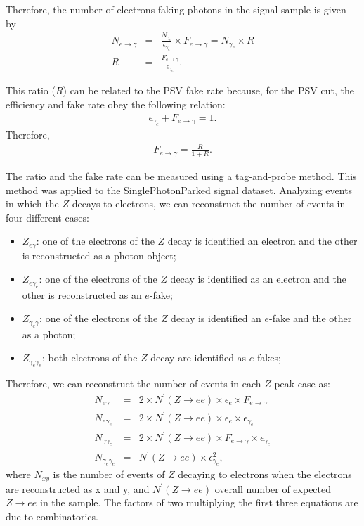 Therefore, the number of electrons-faking-photons in the signal sample is given by
\begin{eqnarray}
N_{e \rightarrow \gamma} &=& \frac{N_{\gamma_e}}{\epsilon_{\gamma_e}} \times  F_{e\rightarrow \gamma} = N_{\gamma_e} \times R\\
R  &=& \frac{F_{e\rightarrow \gamma}}{\epsilon_{\gamma_e}}.
\end{eqnarray}

This ratio ($R$) can be related to the PSV fake rate because, for the PSV cut, the efficiency and fake rate obey the following relation:
\begin{eqnarray}
\epsilon_{\gamma_e} + F_{e\rightarrow \gamma} = 1.
\end{eqnarray}
Therefore,
\begin{eqnarray}
F_{e \rightarrow \gamma} = \frac{R}{1+R}.
\end{eqnarray}

The ratio and the fake rate can be measured using a tag-and-probe method. This method was applied to the SinglePhotonParked signal dataset. Analyzing events in which the $Z$ decays to electrons, we can reconstruct the number of events in four different cases:

\begin{itemize}
\item $Z_{e\gamma}$: one of the electrons of the $Z$ decay is identified an electron and the other is reconstructed as a photon object;
\item $Z_{e\gamma_e}$: one of the electrons of the $Z$ decay is identified as an electron and the other is reconstructed as an $e$-fake;
\item $Z_{\gamma_e\gamma}$: one of the electrons of the $Z$ decay is identified an $e$-fake and the other as a photon;
\item $Z_{\gamma_e \gamma_e}$:  both electrons of the $Z$ decay are identified as $e$-fakes;
\end{itemize} 

Therefore, we can reconstruct the number of events in each $Z$ peak case as:
\begin{eqnarray}
N_{e\gamma} &=& 2\times N^\prime\left( Z\rightarrow ee \right) \times  \epsilon_{e} \times F_{e\rightarrow\gamma}\\
N_{e\gamma_e} &=& 2\times N^\prime\left( Z\rightarrow ee \right) \times \epsilon_{e} \times \epsilon_{\gamma_e}\\
N_{\gamma \gamma_e} &=& 2\times N^\prime\left( Z\rightarrow ee \right) \times F_{e\rightarrow\gamma}\times \epsilon_{\gamma_e} \\
N_{\gamma_e \gamma_e} &=& N^\prime\left( Z\rightarrow ee \right) \times\epsilon_{\gamma_e}^2,
\end{eqnarray}
where $N_{xy}$ is the number of events of $Z$ decaying to electrons when the electrons are reconstructed as x and y, and $N^\prime\left( Z\rightarrow ee \right)$ overall number of expected $Z\rightarrow ee$ in the sample. The factors of two multiplying the first three equations are due to combinatorics.%

